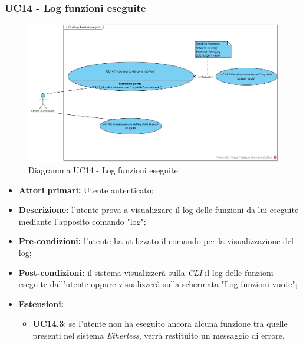 \subsubsection{UC14 - Log funzioni eseguite}
\begin{figure}[h]
	\centering
	\includegraphics[width=\linewidth]{res/img/UC14.jpg}
	\caption{Diagramma UC14 - Log funzioni eseguite}
\end{figure}
\begin{itemize}
	\item \textbf{Attori primari:} Utente autenticato;
	\item \textbf{Descrizione:} l'utente prova a visualizzare il log delle funzioni da lui eseguite mediante l'apposito comando "log";
	\item \textbf{Pre-condizioni:} l'utente ha utilizzato il comando per la visualizzazione del log;
	\item \textbf{Post-condizioni:} il sistema visualizzerà sulla \textit{CLI\glo} il log delle funzioni eseguite dall'utente oppure visualizzerà sulla schermata "Log funzioni vuote";
	\item \textbf{Estensioni:}
	\begin{itemize}
		\item \textbf{UC14.3}: se l'utente non ha eseguito ancora alcuna funzione tra quelle presenti nel sistema \textit{Etherless\glos}, verrà restituito un messaggio di errore.
	\end{itemize}
\end{itemize}
